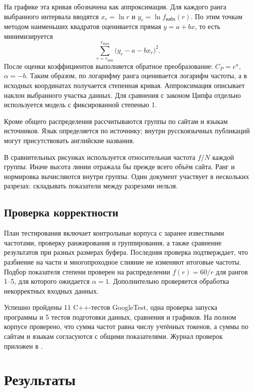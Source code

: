 \documentclass[12pt,a4paper]{article}
\begin{document}
На графике эта кривая обозначена как аппроксимация. Для каждого ранга
выбранного интервала вводятся $x_r=\ln r$ и $y_r=\ln f_{\text{набл}}(r)$.
По этим точкам методом наименьших квадратов оценивается прямая
$y=a+bx$, то есть минимизируется
\[
\sum_{r=r_{\min}}^{r_{\max}}
\bigl(y_r-a-bx_r\bigr)^2.
\]
После оценки коэффициентов выполняется обратное преобразование:
$C_P=e^a$, $\alpha=-b$. Таким образом, по логарифму ранга оценивается
логарифм частоты, а в исходных координатах получается степенная кривая.
Аппроксимация описывает наклон выбранного участка данных. Для сравнения
с законом Ципфа отдельно используется модель с фиксированной степенью 1.

Кроме общего распределения рассчитываются группы по сайтам и языкам
источников. Язык определяется по источнику;
внутри русскоязычных публикаций могут присутствовать английские названия.

В сравнительных рисунках используется относительная частота $f/N$ каждой
группы. Иначе высота линии отражала бы прежде всего объём сайта.
Ранг и нормировка вычисляются внутри группы. Один документ участвует
в нескольких разрезах: складывать показатели между разрезами нельзя.

\subsection{Проверка корректности}
План тестирования включает контрольные корпуса с заранее известными
частотами, проверку ранжирования и группирования, а также сравнение
результатов при разных размерах буфера. Последняя проверка подтверждает,
что разбиение на части и многопроходное слияние не изменяют итоговые частоты.
Подбор показателя степени проверен на распределении $f(r)=60/r$ для
рангов 1--5, для которого ожидается $\alpha=1$. Дополнительно проверяется
обработка некорректных входных данных.

Успешно пройдены 11 C++-тестов GoogleTest, одна проверка запуска программы
и 5 тестов подготовки данных, сравнения и графиков. На полном корпусе проверено,
что сумма частот равна числу учтённых токенов, а суммы по сайтам
и языкам согласуются с общими показателями. Журнал проверок
приложен в .

\section{Результаты}
\end{document}
